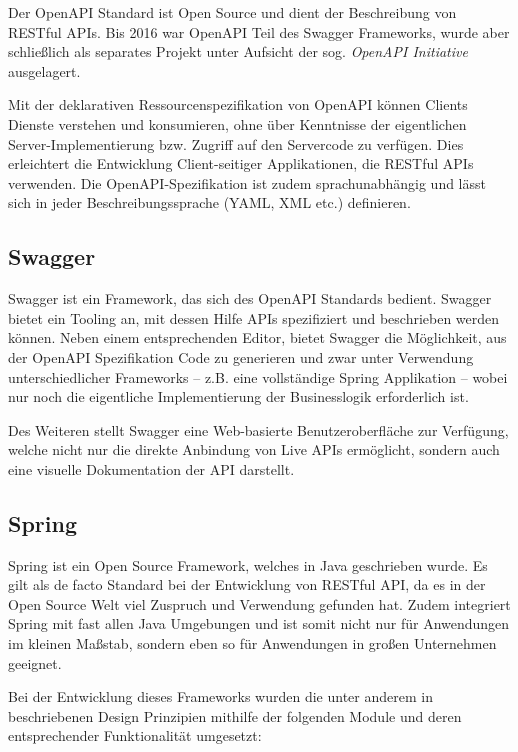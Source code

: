			Der OpenAPI Standard ist Open Source und dient der Beschreibung von RESTful APIs. Bis 2016 war OpenAPI Teil des Swagger Frameworks, wurde aber schließlich als separates Projekt unter Aufsicht der sog. \textit{OpenAPI Initiative}  ausgelagert. 
			
			Mit der deklarativen Ressourcenspezifikation von OpenAPI können Clients Dienste verstehen und konsumieren, ohne über Kenntnisse der eigentlichen Server-Implementierung bzw. Zugriff auf den Servercode zu verfügen. Dies erleichtert die Entwicklung Client-seitiger Applikationen, die RESTful APIs verwenden. Die OpenAPI-Spezifikation ist zudem sprachunabhängig und lässt sich in jeder Beschreibungssprache (\acs{YAML}, \acs{XML} etc.) definieren. 
	
		\subsection{Swagger} %
		
			Swagger ist ein Framework, das sich des OpenAPI Standards bedient. Swagger bietet ein Tooling an, mit dessen Hilfe APIs spezifiziert und beschrieben werden können. Neben einem entsprechenden Editor, bietet Swagger die Möglichkeit, aus der OpenAPI Spezifikation Code zu generieren und zwar unter Verwendung unterschiedlicher Frameworks -- z.B. eine vollständige Spring Applikation -- wobei nur noch die eigentliche Implementierung der Businesslogik erforderlich ist.
			
			Des Weiteren stellt Swagger eine Web-basierte Benutzeroberfläche zur Verfügung, welche nicht nur die direkte Anbindung von Live APIs ermöglicht, sondern auch eine visuelle Dokumentation der \acs{API} darstellt. \cite{SmartBear.2020}
	
		\subsection{Spring} %
		
			Spring ist ein Open Source Framework, welches in Java geschrieben wurde. Es gilt als de facto Standard bei der Entwicklung von RESTful API, da es in der Open Source Welt viel Zuspruch und Verwendung gefunden hat. Zudem integriert Spring mit fast allen Java Umgebungen und ist somit nicht nur für Anwendungen im kleinen Maßstab, sondern eben so für Anwendungen in großen Unternehmen geeignet. \cite{Walls.20162017} 
			
			Bei der Entwicklung dieses Frameworks wurden die unter anderem in \cite{Johnson.2003} beschriebenen Design Prinzipien mithilfe der folgenden Module und deren entsprechender Funktionalität umgesetzt:
			

